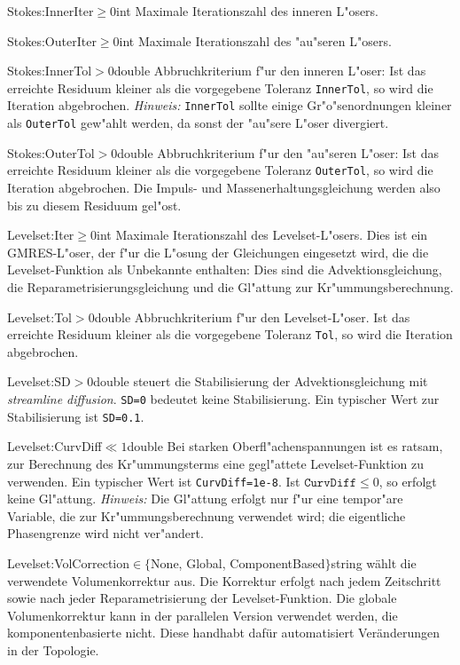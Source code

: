 \begin{Desc}
{Stokes:InnerIter}{$\geq0$}{int}
Maximale Iterationszahl des inneren L"osers. 
\end{Desc}
%
\begin{Desc}
{Stokes:OuterIter}{$\geq0$}{int}
Maximale Iterationszahl des "au"seren L"osers.
\end{Desc}
%
\begin{Desc}
{Stokes:InnerTol}{$>0$}{double}
Abbruchkriterium f"ur den inneren L"oser: Ist das erreichte Residuum kleiner als
die vorgegebene Toleranz \verb|InnerTol|, so wird die Iteration abgebrochen.
\emph{Hinweis:} \verb|InnerTol| sollte einige Gr"o"senordnungen kleiner als
\verb|OuterTol| gew"ahlt werden, da sonst der "au"sere L"oser divergiert.
\end{Desc}
%
\begin{Desc}
{Stokes:OuterTol}{$>0$}{double}
Abbruchkriterium f"ur den "au"seren L"oser: Ist das erreichte Residuum kleiner 
als die vorgegebene Toleranz \verb|OuterTol|, so wird die Iteration abgebrochen.
Die Impuls- und Massenerhaltungsgleichung werden also bis zu diesem Residuum
gel"ost.
\end{Desc}


\begin{Desc}
{Levelset:Iter}{$\geq0$}{int}
Maximale Iterationszahl des Levelset-L"osers. Dies ist ein GMRES-L"oser, der 
f"ur die L"osung der Gleichungen eingesetzt wird, die die Levelset-Funktion 
als Unbekannte enthalten:
Dies sind die Advektionsgleichung, die Reparametrisierungsgleichung und die
Gl"attung zur Kr"ummungsberechnung. 
\end{Desc}
%
\begin{Desc}
{Levelset:Tol}{$>0$}{double}
Abbruchkriterium f"ur den Levelset-L"oser. Ist das erreichte Residuum kleiner 
als die vorgegebene Toleranz \verb|Tol|, so wird die Iteration abgebrochen.
\end{Desc}
%
\begin{Desc}
{Levelset:SD}{$>0$}{double}
steuert die Stabilisierung der Advektionsgleichung mit \emph{streamline 
diffusion}. \verb|SD=0| bedeutet keine Stabilisierung. Ein typischer Wert zur
Stabilisierung ist \verb|SD=0.1|.
\end{Desc}
%
\begin{Desc}
{Levelset:CurvDiff}{$\ll1$}{double}
Bei starken Oberfl"achenspannungen ist es ratsam, zur Berechnung des
Kr"ummungsterms eine gegl"attete Levelset-Funktion zu verwenden. Ein typischer
Wert ist \verb|CurvDiff=1e-8|. Ist $\mathtt{CurvDiff}\leq0$, so erfolgt keine 
Gl"attung. \emph{Hinweis:} Die Gl"attung erfolgt nur f"ur eine tempor"are
Variable, die zur Kr"ummungsberechnung verwendet wird; die eigentliche 
Phasengrenze wird nicht ver"andert.
\end{Desc}
%
\begin{Desc}
{Levelset:VolCorrection}{$\in\{$None, Global, ComponentBased$\}$}{string}
w\"ahlt die verwendete Volumenkorrektur aus. Die Korrektur erfolgt nach jedem Zeitschritt
sowie nach jeder Reparametrisierung der Levelset-Funktion. Die globale Volumenkorrektur
kann in der parallelen Version verwendet werden, die komponentenbasierte nicht. Diese
handhabt daf\"ur automatisiert Ver\"anderungen in der Topologie.
\end{Desc}



